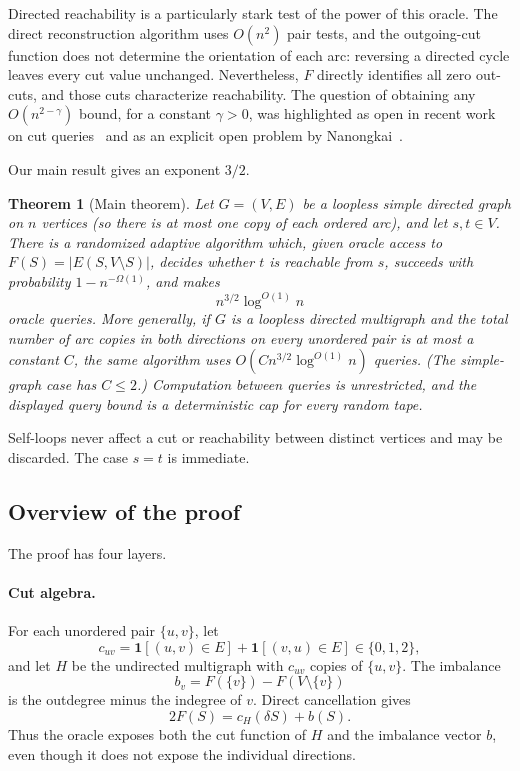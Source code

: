 \documentclass[11pt]{article}
\newtheorem{theorem}{Theorem}[section]
\theoremstyle{definition}
\newcommand{\id}{\mathbf{1}}
\newcommand{\cH}{c_H}
\begin{document}
Directed reachability is a particularly stark test of the power of this
oracle.  The direct reconstruction algorithm uses $O(n^2)$ pair tests, and
the outgoing-cut function does not determine the orientation of each arc:
reversing a directed cycle leaves every cut value unchanged.  Nevertheless,
$F$ directly identifies all zero out-cuts, and those cuts characterize
reachability.  The question of obtaining any
$O(n^{2-\gamma})$ bound, for a constant $\gamma>0$, was highlighted as open
in recent work on cut queries~\cite{JiangNanongkaiSawettamalya2026} and as an
explicit open problem by Nanongkai~\cite{NanongkaiOpen}.

Our main result gives an exponent $3/2$.

\begin{theorem}[Main theorem]\label{thm:main}
Let $G=(V,E)$ be a loopless simple directed graph on $n$ vertices (so there
is at most one copy of each ordered arc), and let $s,t\in V$.  There is a
randomized adaptive algorithm which, given oracle access to
$F(S)=|E(S,V\setminus S)|$, decides whether $t$ is reachable from $s$,
succeeds with probability $1-n^{-\Omega(1)}$, and makes
\[
        n^{3/2}\log^{O(1)}n
\]
oracle queries.  More generally, if $G$ is a loopless directed multigraph
and the total number of arc copies in both directions on every unordered
pair is at most a constant $C$, the same algorithm uses
$O(Cn^{3/2}\log^{O(1)}n)$ queries.  (The simple-graph case has $C\le2$.)
Computation between queries is unrestricted, and the displayed query bound
is a deterministic cap for every random tape.
\end{theorem}

Self-loops never affect a cut or reachability between distinct vertices and
may be discarded.  The case $s=t$ is immediate.

\subsection{Overview of the proof}

The proof has four layers.

\paragraph{Cut algebra.}
For each unordered pair $\{u,v\}$, let
\[
 c_{uv}=\id[(u,v)\in E]+\id[(v,u)\in E]\in\{0,1,2\},
\]
and let $H$ be the undirected multigraph with $c_{uv}$ copies of
$\{u,v\}$.  The imbalance
\[
 b_v=F(\{v\})-F(V\setminus\{v\})
\]
is the outdegree minus the indegree of $v$.  Direct cancellation gives
\[
        2F(S)=\cH(\delta S)+b(S).
\]
Thus the oracle exposes both the cut function of $H$ and the imbalance
vector $b$, even though it does not expose the individual directions.
\end{document}

